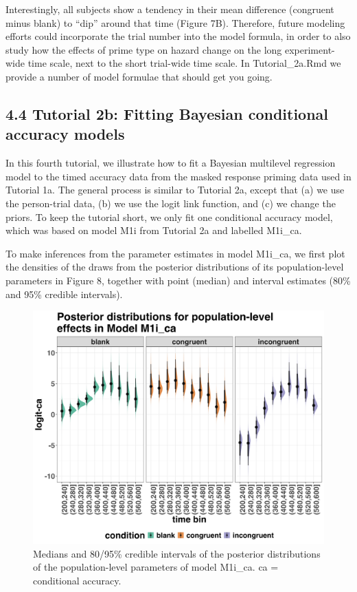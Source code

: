 \documentclass[
  man, donotrepeattitle,floatsintext]{apa6}
\begin{document}
Interestingly, all subjects show a tendency in their mean difference (congruent minus blank) to ``dip'' around that time (Figure 7B). Therefore, future modeling efforts could incorporate the trial number into the model formula, in order to also study how the effects of prime type on hazard change on the long experiment-wide time scale, next to the short trial-wide time scale. In Tutorial\_2a.Rmd we provide a number of model formulae that should get you going.

\subsection{4.4 Tutorial 2b: Fitting Bayesian conditional accuracy models}\label{tutorial-2b-fitting-bayesian-conditional-accuracy-models}

In this fourth tutorial, we illustrate how to fit a Bayesian multilevel regression model to the timed accuracy data from the masked response priming data used in Tutorial 1a. The general process is similar to Tutorial 2a, except that (a) we use the person-trial data, (b) we use the logit link function, and (c) we change the priors. To keep the tutorial short, we only fit one conditional accuracy model, which was based on model M1i from Tutorial 2a and labelled M1i\_ca.

To make inferences from the parameter estimates in model M1i\_ca, we first plot the densities of the draws from the posterior distributions of its population-level parameters in Figure 8, together with point (median) and interval estimates (80\% and 95\% credible intervals).



\begin{figure}[H]

{\centering \includegraphics[width=0.8\linewidth,height=0.67\textheight,]{../Tutorial_2_Bayesian/figures/M1i_ca_postdistr} 

}

\caption{Medians and 80/95\% credible intervals of the posterior distributions of the population-level parameters of model M1i\_ca. ca = conditional accuracy.}\label{fig:plot-ca-fixed-effects}
\end{figure}
\end{document}
